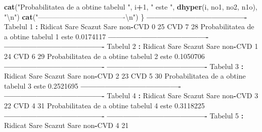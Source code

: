 \documentclass[]{article}
\newenvironment{Shaded}{\begin{snugshade}}{\end{snugshade}}
\newcommand{\KeywordTok}[1]{\textcolor[rgb]{0.13,0.29,0.53}{\textbf{#1}}}
\newcommand{\DecValTok}[1]{\textcolor[rgb]{0.00,0.00,0.81}{#1}}
\newcommand{\FloatTok}[1]{\textcolor[rgb]{0.00,0.00,0.81}{#1}}
\newcommand{\CharTok}[1]{\textcolor[rgb]{0.31,0.60,0.02}{#1}}
\newcommand{\StringTok}[1]{\textcolor[rgb]{0.31,0.60,0.02}{#1}}
\newcommand{\OperatorTok}[1]{\textcolor[rgb]{0.81,0.36,0.00}{\textbf{#1}}}
\newcommand{\NormalTok}[1]{#1}
\begin{document}
\begin{Shaded}
\begin{Highlighting}[]
  \KeywordTok{cat}\NormalTok{(}\StringTok{"Probabilitatea de a obtine tabelul "}\NormalTok{, i}\OperatorTok{+}\DecValTok{1}\NormalTok{, }\StringTok{" este "}\NormalTok{, }
      \KeywordTok{dhyper}\NormalTok{(i, no1, no2, n1o), }\StringTok{"}\CharTok{\textbackslash{}n}\StringTok{"}\NormalTok{)}
  \KeywordTok{cat}\NormalTok{(}\StringTok{"-------------------------------------}\CharTok{\textbackslash{}n}\StringTok{"}\NormalTok{)}
\NormalTok{\}}
\OperatorTok{-------------------------------------}
\NormalTok{Tabelul  }\DecValTok{1}  \OperatorTok{:}
\StringTok{        }\NormalTok{Ridicat Sare Scazut Sare}
\NormalTok{non}\OperatorTok{-}\NormalTok{CVD            }\DecValTok{0}          \DecValTok{25}
\NormalTok{CVD                }\DecValTok{7}          \DecValTok{28}
\NormalTok{Probabilitatea de a obtine tabelul  }\DecValTok{1}\NormalTok{  este  }\FloatTok{0.0174117} 
\OperatorTok{-------------------------------------}
\OperatorTok{-------------------------------------}
\NormalTok{Tabelul  }\DecValTok{2}  \OperatorTok{:}
\StringTok{        }\NormalTok{Ridicat Sare Scazut Sare}
\NormalTok{non}\OperatorTok{-}\NormalTok{CVD            }\DecValTok{1}          \DecValTok{24}
\NormalTok{CVD                }\DecValTok{6}          \DecValTok{29}
\NormalTok{Probabilitatea de a obtine tabelul  }\DecValTok{2}\NormalTok{  este  }\FloatTok{0.1050706} 
\OperatorTok{-------------------------------------}
\OperatorTok{-------------------------------------}
\NormalTok{Tabelul  }\DecValTok{3}  \OperatorTok{:}
\StringTok{        }\NormalTok{Ridicat Sare Scazut Sare}
\NormalTok{non}\OperatorTok{-}\NormalTok{CVD            }\DecValTok{2}          \DecValTok{23}
\NormalTok{CVD                }\DecValTok{5}          \DecValTok{30}
\NormalTok{Probabilitatea de a obtine tabelul  }\DecValTok{3}\NormalTok{  este  }\FloatTok{0.2521695} 
\OperatorTok{-------------------------------------}
\OperatorTok{-------------------------------------}
\NormalTok{Tabelul  }\DecValTok{4}  \OperatorTok{:}
\StringTok{        }\NormalTok{Ridicat Sare Scazut Sare}
\NormalTok{non}\OperatorTok{-}\NormalTok{CVD            }\DecValTok{3}          \DecValTok{22}
\NormalTok{CVD                }\DecValTok{4}          \DecValTok{31}
\NormalTok{Probabilitatea de a obtine tabelul  }\DecValTok{4}\NormalTok{  este  }\FloatTok{0.3118225} 
\OperatorTok{-------------------------------------}
\OperatorTok{-------------------------------------}
\NormalTok{Tabelul  }\DecValTok{5}  \OperatorTok{:}
\StringTok{        }\NormalTok{Ridicat Sare Scazut Sare}
\NormalTok{non}\OperatorTok{-}\NormalTok{CVD            }\DecValTok{4}          \DecValTok{21}

\end{Highlighting}
\end{Shaded}
\end{document}
